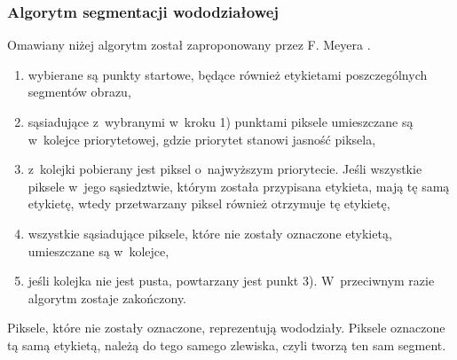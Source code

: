 \subsubsection{Algorytm segmentacji wododziałowej}
Omawiany niżej algorytm został zaproponowany przez F. Meyera \cite{beucher93}.
\begin{enumerate}
  \item wybierane są punkty startowe, będące również etykietami poszczególnych segmentów obrazu,
  \item sąsiadujące z~wybranymi w~kroku 1) punktami piksele umieszczane są w~kolejce priorytetowej, gdzie priorytet stanowi jasność piksela,
  \item z~kolejki pobierany jest piksel o~najwyższym priorytecie. Jeśli wszystkie piksele w~jego sąsiedztwie, którym została przypisana etykieta, mają tę samą etykietę, wtedy przetwarzany piksel również otrzymuje tę etykietę,
  \item wszystkie sąsiadujące piksele, które nie zostały oznaczone etykietą, umieszczane są w~kolejce,
  \item jeśli kolejka nie jest pusta, powtarzany jest punkt 3). W~przeciwnym razie algorytm zostaje zakończony.
\end{enumerate}
Piksele, które nie zostały oznaczone, reprezentują wododziały. Piksele oznaczone tą samą etykietą, należą do tego samego zlewiska, czyli tworzą ten sam segment.
